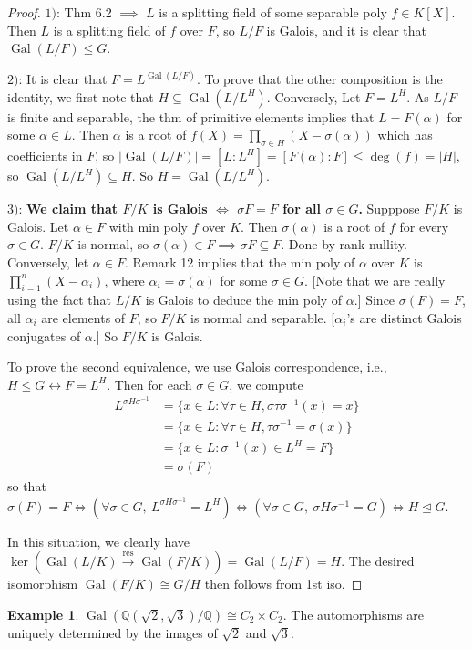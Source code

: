 \documentclass{article}
\theoremstyle{definition}
\newtheorem{example}[defn]{Example}
\theoremstyle{remark}
\theoremstyle{plain}
\newcommand{\QQ}{\mathbb{Q}}
\newcommand{\Gal}{\operatorname{Gal}}
\begin{document}
\begin{proof}
    $1)$: Thm 6.2 $\implies$ $L$ is a splitting field of some separable poly $f\in K[X]$. Then $L$ is a splitting field of $f$ over $F$, so $L/F$ is Galois, and it is clear that $\Gal(L/F)\le G$. 

    $2)$: It is clear that $F=L^{\Gal(L/F)}$. To prove that the other composition is the identity, we first note that $H\subseteq\Gal(L/L^H)$. Conversely, Let $F=L^H$. As $L/F$ is finite and separable, the thm of primitive elements implies that $L=F(\alpha)$ for some $\alpha\in L$. Then $\alpha$ is a root of $f(X)=\prod_{\sigma\in H}(X-\sigma(\alpha))$ which has coefficients in $F$, so $|\Gal(L/F)|=[L:L^H]=[F(\alpha):F]\le\deg(f)=|H|$, so $\Gal(L/L^H)\subseteq H$. So $H=\Gal(L/L^H)$.

    $3)$: \textbf{We claim that $F/K$ is Galois $\Leftrightarrow$ $\sigma F=F$ for all $\sigma\in G$.} Supppose $F/K$ is Galois. Let $\alpha\in F$ with min poly $f$ over $K$. Then $\sigma(\alpha)$ is a root of $f$ for every $\sigma\in G$. $F/K$ is normal, so $\sigma(\alpha)\in F\implies \sigma F\subseteq F$. Done by rank-nullity. Conversely, let $\alpha\in F$. Remark 12 implies that the min poly of $\alpha$ over $K$ is $\prod_{i=1}^n(X-\alpha_i)$, where $\alpha_i=\sigma(\alpha)$ for some $\sigma\in G$. [Note that we are really using the fact that $L/K$ is Galois to deduce the min poly of $\alpha$.] Since $\sigma(F)=F$, all $\alpha_i$ are elements of $F$, so $F/K$ is normal and separable. [$\alpha_i$'s are distinct Galois conjugates of $\alpha$.] So $F/K$ is Galois.

    To prove the second equivalence, we use Galois correspondence, i.e., $H\le G\leftrightarrow F=L^H$. Then for each $\sigma\in G$, we compute
    \begin{align*}
        L^{\sigma H\sigma^{-1}}&=\{x\in L:\forall\tau\in H,\sigma\tau\sigma^{-1}(x)=x\}\\
        &=\{x\in L:\forall\tau\in H,\tau\sigma^{-1}=\sigma(x)\}\\
        &=\{x\in L:\sigma^{-1}(x)\in L^H=F\}\\
        &=\sigma(F)
    \end{align*}
    so that $\sigma(F)=F\Leftrightarrow (\forall\sigma\in G,\ L^{\sigma H\sigma^{-1}}=L^H)\Leftrightarrow(\forall\sigma\in G,\ \sigma H\sigma^{-1}=G)\Leftrightarrow H\trianglelefteq G$.

    In this situation, we clearly have $\ker(\Gal(L/K)\overset{\operatorname{res}}{\longrightarrow}\Gal(F/K))=\Gal(L/F)=H$. The desired isomorphism $\Gal(F/K)\cong G/H$ then follows from 1st iso.
\end{proof}
\begin{example}
    $\Gal(\QQ(\sqrt2,\sqrt3)/\QQ)\cong C_2\times C_2$. The automorphisms are uniquely determined by the images of $\sqrt2$ and $\sqrt3$.
\end{example}
\end{document}
